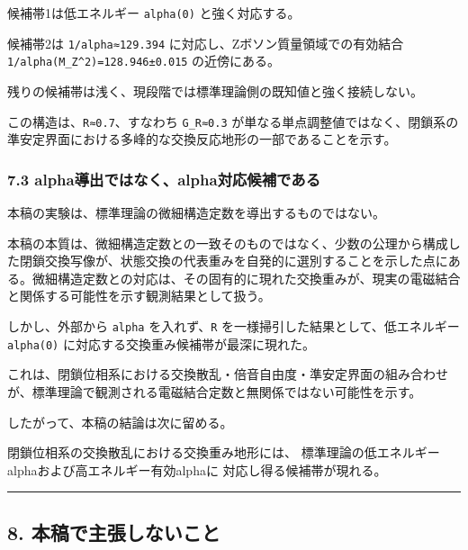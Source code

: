 \documentclass[
]{article}
\newenvironment{Shaded}{}{}
\newcommand{\NormalTok}[1]{#1}
\begin{document}
候補帯1は低エネルギー \texttt{alpha(0)} と強く対応する。

候補帯2は \texttt{1/alpha≈129.394} に対応し、Zボソン質量領域での有効結合
\texttt{1/alpha(M\_Z\^{}2)=128.946±0.015} の近傍にある。

残りの候補帯は浅く、現段階では標準理論側の既知値と強く接続しない。

この構造は、\texttt{R≈0.7}、すなわち \texttt{G\_R≈0.3}
が単なる単点調整値ではなく、閉鎖系の準安定界面における多峰的な交換反応地形の一部であることを示す。

\subsubsection{7.3
alpha導出ではなく、alpha対応候補である}\label{alphaux5c0eux51faux3067ux306fux306aux304falphaux5bfeux5fdcux5019ux88dcux3067ux3042ux308b}

本稿の実験は、標準理論の微細構造定数を導出するものではない。

本稿の本質は、微細構造定数との一致そのものではなく、少数の公理から構成した閉鎖交換写像が、状態交換の代表重みを自発的に選別することを示した点にある。微細構造定数との対応は、その固有的に現れた交換重みが、現実の電磁結合と関係する可能性を示す観測結果として扱う。

しかし、外部から \texttt{alpha} を入れず、\texttt{R}
を一様掃引した結果として、低エネルギー \texttt{alpha(0)}
に対応する交換重み候補帯が最深に現れた。

これは、閉鎖位相系における交換散乱・倍音自由度・準安定界面の組み合わせが、標準理論で観測される電磁結合定数と無関係ではない可能性を示す。

したがって、本稿の結論は次に留める。

\begin{Shaded}
\begin{Highlighting}[]
\NormalTok{閉鎖位相系の交換散乱における交換重み地形には、}
\NormalTok{標準理論の低エネルギーalphaおよび高エネルギー有効alphaに}
\NormalTok{対応し得る候補帯が現れる。}
\end{Highlighting}
\end{Shaded}

\begin{center}\rule{0.5\linewidth}{0.5pt}\end{center}

\subsection{8.
本稿で主張しないこと}\label{ux672cux7a3fux3067ux4e3bux5f35ux3057ux306aux3044ux3053ux3068}
\end{document}
